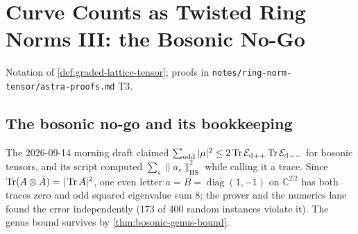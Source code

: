 
\section{Curve Counts as Twisted Ring Norms III: the Bosonic No-Go}
\label{sec:ring-norm-bosonic-nogo}

Notation of \cref{def:graded-lattice-tensor}; proofs in
\texttt{notes/ring-norm-tensor/astra-proofs.md} T3.

\subsection{The bosonic no-go and its bookkeeping}

\begin{observation}
\label{obs:drafted-hs-bound-false}
The 2026-09-14 morning draft claimed $\sum_{\mathrm{odd}}|\mu|^2\le2\operatorname{Tr}{\mathcal E_{\mathrm d}}_{++}\operatorname{Tr}{\mathcal E_{\mathrm d}}_{--}$ for %
bosonic tensors, and its script computed $\sum_s\|a_s\|_{\mathrm{HS}}^2$ while calling it a trace.
Since $\operatorname{Tr}(A\otimes\bar A) = |\operatorname{Tr} A|^2$, one even letter $a = B = \operatorname{diag}(1,-1)$ on
$\mathbb C^{2|2}$ has both traces zero and odd squared eigenvalue sum $8$; the prover and the
numerics lane found the error independently (173 of 400 random instances violate it). The
genus bound survives by \cref{thm:bosonic-genus-bound}.
\end{observation}

